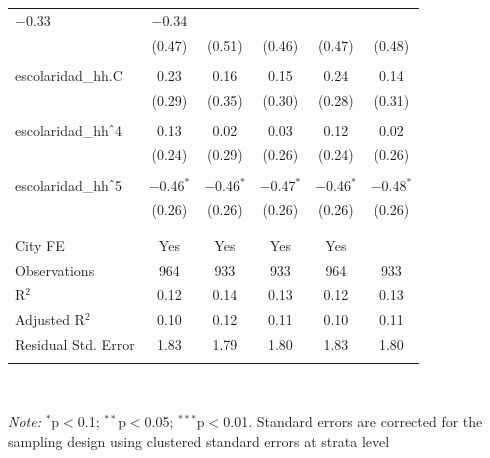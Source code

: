 \begin{table}[H]
\begin{tabularx}{0.9\textwidth}{@{\extracolsep{-7pt}}lccccc}
$-$0.33 & $-$0.34 \\    & (0.47) & (0.51) & (0.46) & (0.47) & (0.48) \\    & & & & & \\   escolaridad\_hh.C & 0.23 & 0.16 & 0.15 & 0.24 & 0.14 \\    & (0.29) & (0.35) & (0.30) & (0.28) & (0.31) \\    & & & & & \\   escolaridad\_hh$\hat{\mkern6mu}$4 & 0.13 & 0.02 & 0.03 & 0.12 & 0.02 \\    & (0.24) & (0.29) & (0.26) & (0.24) & (0.26) \\    & & & & & \\   escolaridad\_hh$\hat{\mkern6mu}$5 & $-$0.46$^{*}$ & $-$0.46$^{*}$ & $-$0.47$^{*}$ & $-$0.46$^{*}$ & $-$0.48$^{*}$ \\    & (0.26) & (0.26) & (0.26) & (0.26) & (0.26) \\    & & & & & \\  \hline \\[-1.8ex]  City FE & Yes & Yes & Yes & Yes &  \\  Observations & 964 & 933 & 933 & 964 & 933 \\  R$^{2}$ & 0.12 & 0.14 & 0.13 & 0.12 & 0.13 \\  Adjusted R$^{2}$ & 0.10 & 0.12 & 0.11 & 0.10 & 0.11 \\  Residual Std. Error & 1.83 & 1.79 & 1.80 & 1.83 & 1.80 \\  \hline  \hline \\[-1.8ex]  \end{tabularx} \\ \parbox[]{\textwidth}{\textit{Note:} $^{*}$p$<$0.1; $^{**}$p$<$0.05; $^{***}$p$<$0.01. Standard errors are corrected for the sampling design using clustered standard errors at strata level }  \end{table} 